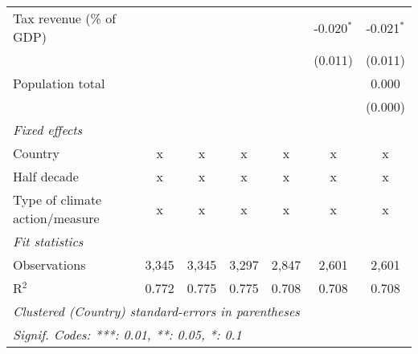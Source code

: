 \begin{tabular}{lcccccc}
   Tax revenue (\% of GDP)                &               &               &               &              & -0.020$^{*}$  & -0.021$^{*}$\\   
                                          &               &               &               &              & (0.011)       & (0.011)\\   
   Population total                       &               &               &               &              &               & 0.000\\   
                                          &               &               &               &              &               & (0.000)\\   
   \emph{Fixed effects}\\
   Country                                & x             & x             & x             & x            & x             & x\\  
   Half decade                            & x             & x             & x             & x            & x             & x\\  
   Type of climate action/measure         & x             & x             & x             & x            & x             & x\\  
   \midrule \emph{Fit statistics}\\
   Observations                           & 3,345         & 3,345         & 3,297         & 2,847        & 2,601         & 2,601\\  
   R$^2$                                  & 0.772         & 0.775         & 0.775         & 0.708        & 0.708         & 0.708\\  
   \midrule
   \multicolumn{7}{l}{\emph{Clustered (Country) standard-errors in parentheses}}\\
   \multicolumn{7}{l}{\emph{Signif. Codes: ***: 0.01, **: 0.05, *: 0.1}}\\
\end{tabular}
\par\endgroup


